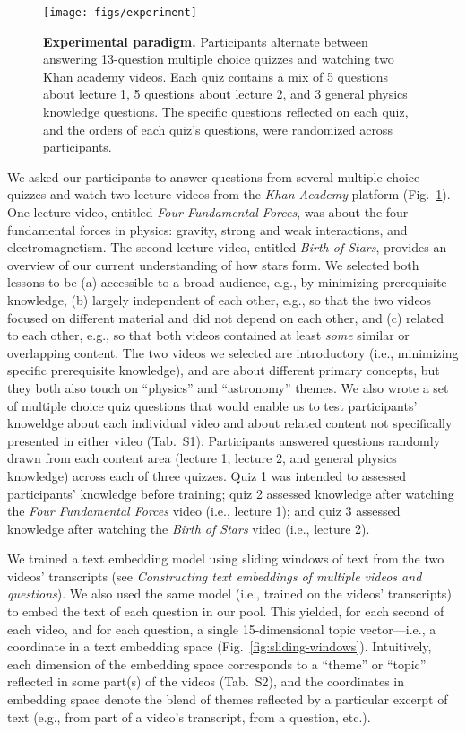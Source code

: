 \documentclass[10pt]{article}
\newcommand{\questions}{S1}
\newcommand{\topics}{S2}
\begin{document}
\begin{figure}[tp]
    \centering
    \texttt{[image: figs/experiment]}
    
    \caption{\textbf{Experimental paradigm.} Participants alternate between
    answering 13-question multiple choice quizzes and watching two Khan academy
    videos. Each quiz contains a mix of 5 questions about lecture 1, 5
    questions about lecture 2, and 3 general physics knowledge questions. The
    specific questions reflected on each quiz, and the orders of each quiz's
    questions, were randomized across participants.}
    
    \label{fig:experiment}
\end{figure}

We asked our participants to answer questions from several multiple choice
quizzes and watch two lecture videos from the \textit{Khan Academy} platform
(Fig.~\ref{fig:experiment}). One lecture video, entitled \textit{Four
Fundamental Forces}, was about the four fundamental forces in physics: gravity,
strong and weak interactions, and electromagnetism. The second lecture video,
entitled \textit{Birth of Stars}, provides an overview of our current
understanding of how stars form. We selected both lessons to be (a) accessible
to a broad audience, e.g., by minimizing prerequisite knowledge, (b) largely
independent of each other, e.g., so that the two videos focused on different
material and did not depend on each other, and (c) related to each other, e.g.,
so that both videos contained at least \textit{some} similar or overlapping
content. The two videos we selected are introductory (i.e., minimizing specific
prerequisite knowledge), and are about different primary concepts, but they
both also touch on ``physics'' and ``astronomy'' themes. We also wrote a set of
multiple choice quiz questions that would enable us to test participants'
knoweldge about each individual video and about related content not
specifically presented in either video (Tab.~\questions). Participants answered
questions randomly drawn from each content area (lecture 1, lecture 2, and
general physics knowledge) across each of three quizzes. Quiz 1 was intended to
assessed participants' knowledge before training; quiz 2 assessed knowledge
after watching the \textit{Four Fundamental Forces} video (i.e., lecture 1);
and quiz 3 assessed knowledge after watching the \textit{Birth of Stars} video
(i.e., lecture 2).

We trained a text embedding model using sliding windows of text from the two
videos' transcripts (see \textit{Constructing text embeddings of multiple
videos and questions}). We also used the same model (i.e., trained on the
videos' transcripts) to embed the text of each question in our pool. This
yielded, for each second of each video, and for each question, a single
15-dimensional topic vector---i.e., a coordinate in a text embedding space
(Fig.~\ref{fig:sliding-windows}). Intuitively, each dimension of the embedding
space corresponds to a ``theme'' or ``topic'' reflected in some part(s) of the
videos (Tab.~\topics), and the coordinates in embedding space denote the blend
of themes reflected by a particular excerpt of text (e.g., from part of a
video's transcript, from a question, etc.).
\end{document}
